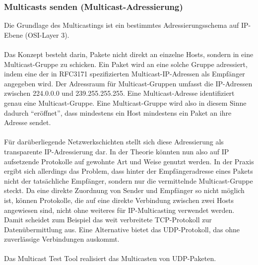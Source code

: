 \subsubsection{Multicasts senden (Multicast-Adressierung)}
Die Grundlage des Multicastings ist ein bestimmtes
Adressierungsschema auf IP-Ebene (OSI-Layer 3).\\
\\
Das Konzept besteht darin, Pakete nicht direkt an einzelne Hosts, sondern in
eine Multicast-Gruppe zu schicken. Ein Paket wird an eine solche Gruppe adressiert,
indem eine der in RFC3171 spezifizierten Multicast-IP-Adressen als
Empfänger angegeben wird. Der Adressraum für Multicast-Gruppen umfasst die IP-Adressen zwischen
224.0.0.0 und 239.255.255.255. Eine Multicast-Adresse identifiziert genau eine
Multicast-Gruppe. Eine Multicast-Gruppe wird also in diesem Sinne dadurch
"`eröffnet"', dass mindestens ein Host mindestens ein Paket an
ihre Adresse sendet.\\
\\
Für darüberliegende Netzwerkschichten stellt sich diese
Adressierung als transparente IP-Adressierung dar. In der Theorie könnten nun
also auf IP aufsetzende Protokolle auf gewohnte Art und Weise genutzt werden. In
der Praxis ergibt sich allerdings das Problem, dass hinter der Empfängeradresse
eines Pakets nicht der tatsächliche Empfänger, sondern nur die vermittelnde
Multicast-Gruppe steckt. Da eine direkte Zuordnung von Sender und Empfänger so
nicht möglich ist, können Protokolle, die auf eine direkte Verbindung zwischen
zwei Hosts angewiesen sind, nicht ohne weiteres für IP-Multicasting verwendet
werden. Damit scheidet zum Beispiel das weit verbreitete TCP-Protokoll zur
Datenübermittlung aus. Eine Alternative bietet das
UDP-Protokoll, das ohne zuverlässige Verbindungen auskommt.\\
\\
Das Multicast Test Tool realisiert das Multicasten von
UDP-Paketen.

